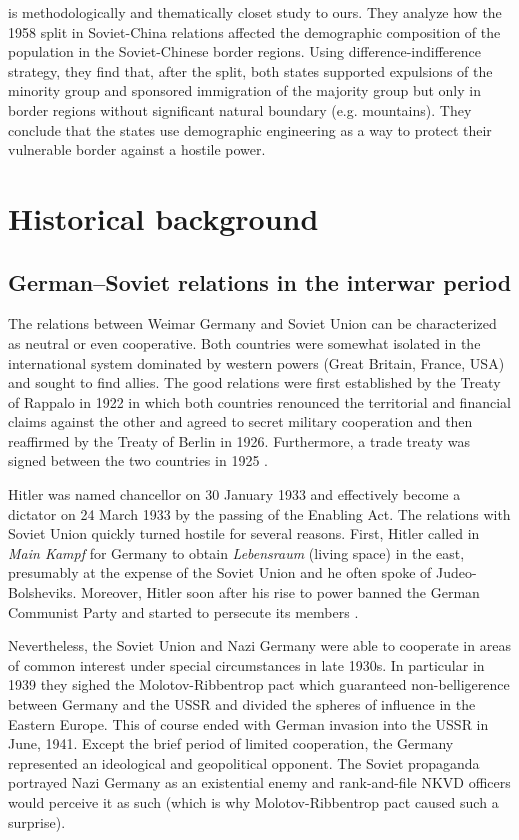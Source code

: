 \documentclass[11pt]{article}
\begin{document}
\citet{mcnamee_demographic_nodate} is methodologically and thematically closet study to ours. They analyze how the 1958 split in Soviet-China relations affected the demographic composition of the population in the Soviet-Chinese border regions.
Using difference-indifference strategy, they find that, after the split,  both states supported expulsions  of the minority group and sponsored immigration of the majority group but only in border regions without significant natural boundary (e.g. mountains). They conclude that the states use demographic engineering as a way to protect their vulnerable border against a hostile power. 

\section{Historical background}
\subsection{German–Soviet relations in the interwar period}
The relations between Weimar Germany and Soviet Union can be characterized as neutral or even cooperative. Both countries were somewhat isolated in the international system dominated by western powers (Great Britain, France, USA) and sought to find allies. The good relations were first established by the Treaty of Rappalo in 1922 in which both countries renounced the territorial and financial claims against the other and agreed to secret military cooperation \citep{gatzke_russo-german_1958} and then reaffirmed by the Treaty of Berlin in 1926. Furthermore, a trade treaty was signed between the two countries in 1925 \citep{morgan_political_1963}.

Hitler was named chancellor on 30 January 1933 and effectively become a dictator on 24 March 1933 by the passing of the Enabling Act. 
The relations with Soviet Union quickly turned hostile for several reasons.  First, Hitler called in \emph{Main Kampf} for Germany to obtain \emph{Lebensraum} (living space) in the east, presumably at the expense of the Soviet Union and he often spoke of Judeo-Bolsheviks. Moreover, Hitler soon after his rise to power banned the German Communist Party and started to persecute its members  \citep{haslam_soviet_1984}. 

Nevertheless, the Soviet Union and Nazi Germany were able to cooperate in areas of common interest under special circumstances in late 1930s. In particular in 1939 they sighed the  Molotov-Ribbentrop pact which guaranteed non-belligerence between Germany and the USSR and divided the spheres of influence in the Eastern Europe. This of course ended with German invasion into the USSR in June, 1941.  
Except the brief period of limited cooperation, the Germany represented an ideological and geopolitical opponent. The Soviet propaganda portrayed Nazi Germany as an existential enemy and rank-and-file NKVD officers would perceive it as such (which is why Molotov-Ribbentrop pact caused such a surprise). 
\end{document}
